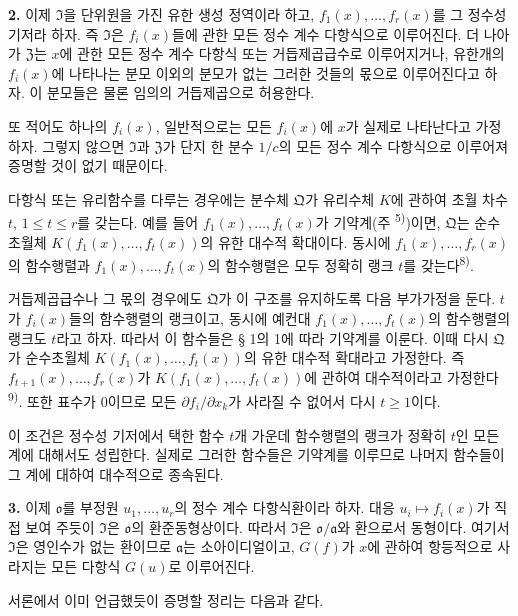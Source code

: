 \textbf{2.}
이제 \(\mathfrak I\)을 단위원을 가진 유한 생성 정역이라 하고, \(f_1(x),\ldots,f_r(x)\)를 그 정수성 기저라 하자. 즉 \(\mathfrak I\)은 \(f_i(x)\)들에 관한 모든 정수 계수 다항식으로 이루어진다. 더 나아가 \(\mathfrak Z\)는 \(x\)에 관한 모든 정수 계수 다항식 또는 거듭제곱급수로 이루어지거나, 유한개의 \(f_i(x)\)에 나타나는 분모 이외의 분모가 없는 그러한 것들의 몫으로 이루어진다고 하자. 이 분모들은 물론 임의의 거듭제곱으로 허용한다.

또 적어도 하나의 \(f_i(x)\), 일반적으로는 모든 \(f_i(x)\)에 \(x\)가 실제로 나타난다고 가정하자. 그렇지 않으면 \(\mathfrak I\)과 \(\mathfrak Z\)가 단지 한 분수 \(1/c\)의 모든 정수 계수 다항식으로 이루어져 증명할 것이 없기 때문이다.

다항식 또는 유리함수를 다루는 경우에는 분수체 \(\mathfrak Q\)가 유리수체 \(K\)에 관하여 초월 차수 \(t\), \(1\leq t\leq r\)를 갖는다. 예를 들어 \(f_1(x),\ldots,f_t(x)\)가 기약계(주 \textsuperscript{5)})이면, \(\mathfrak Q\)는 순수초월체 \(K(f_1(x),\ldots,f_t(x))\)의 유한 대수적 확대이다. 동시에 \(f_1(x),\ldots,f_r(x)\)의 함수행렬과 \(f_1(x),\ldots,f_t(x)\)의 함수행렬은 모두 정확히 랭크 \(t\)를 갖는다\textsuperscript{8)}.

거듭제곱급수나 그 몫의 경우에도 \(\mathfrak Q\)가 이 구조를 유지하도록 다음 부가가정을 둔다. \(t\)가 \(f_i(x)\)들의 함수행렬의 랭크이고, 동시에 예컨대 \(f_1(x),\ldots,f_t(x)\)의 함수행렬의 랭크도 \(t\)라고 하자. 따라서 이 함수들은 § 1의 1에 따라 기약계를 이룬다. 이때 다시 \(\mathfrak Q\)가 순수초월체 \(K(f_1(x),\ldots,f_t(x))\)의 유한 대수적 확대라고 가정한다. 즉 \(f_{t+1}(x),\ldots,f_r(x)\)가 \(K(f_1(x),\ldots,f_t(x))\)에 관하여 대수적이라고 가정한다\textsuperscript{9)}. 또한 표수가 0이므로 모든 \(\partial f_i/\partial x_k\)가 사라질 수 없어서 다시 \(t\geq1\)이다.

이 조건은 정수성 기저에서 택한 함수 \(t\)개 가운데 함수행렬의 랭크가 정확히 \(t\)인 모든 계에 대해서도 성립한다. 실제로 그러한 함수들은 기약계를 이루므로 나머지 함수들이 그 계에 대하여 대수적으로 종속된다.

\textbf{3.}
이제 \(\mathfrak o\)를 부정원 \(u_1,\ldots,u_r\)의 정수 계수 다항식환이라 하자. 대응 \(u_i\mapsto f_i(x)\)가 직접 보여 주듯이 \(\mathfrak I\)은 \(\mathfrak o\)의 환준동형상이다. 따라서 \(\mathfrak I\)은 \(\mathfrak o/\mathfrak a\)와 환으로서 동형이다. 여기서 \(\mathfrak I\)은 영인수가 없는 환이므로 \(\mathfrak a\)는 소아이디얼이고, \(G(f)\)가 \(x\)에 관하여 항등적으로 사라지는 모든 다항식 \(G(u)\)로 이루어진다.

서론에서 이미 언급했듯이 증명할 정리는 다음과 같다.

